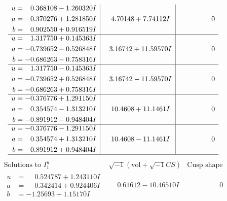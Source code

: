 \documentclass[1p]{elsarticle_modified}
\theoremstyle{definition}
\newcommand{\I}{\sqrt{-1}}
\begin{document}
$$\begin{array}{c|c|c}
\begin{aligned}
u &= \phantom{-}0.368108 - 1.260320 I \\
a &= -0.370276 + 1.281850 I \\
b &= \phantom{-}0.902550 + 0.916519 I\end{aligned}
 & \phantom{-}4.70148 + 7.74112 I & \phantom{-0.000000 } 0 \\ \hline\begin{aligned}
u &= \phantom{-}1.317750 + 0.145363 I \\
a &= -0.739652 - 0.526848 I \\
b &= -0.686263 - 0.758316 I\end{aligned}
 & \phantom{-}3.16742 + 11.59570 I & \phantom{-0.000000 } 0 \\ \hline\begin{aligned}
u &= \phantom{-}1.317750 - 0.145363 I \\
a &= -0.739652 + 0.526848 I \\
b &= -0.686263 + 0.758316 I\end{aligned}
 & \phantom{-}3.16742 - 11.59570 I & \phantom{-0.000000 } 0 \\ \hline\begin{aligned}
u &= -0.376776 + 1.291150 I \\
a &= \phantom{-}0.354574 - 1.313210 I \\
b &= -0.891912 - 0.948404 I\end{aligned}
 & \phantom{-}10.4608 + 11.1461 I & \phantom{-0.000000 } 0 \\ \hline\begin{aligned}
u &= -0.376776 - 1.291150 I \\
a &= \phantom{-}0.354574 + 1.313210 I \\
b &= -0.891912 + 0.948404 I\end{aligned}
 & \phantom{-}10.4608 - 11.1461 I & \phantom{-0.000000 } 0\\
 \hline 
 \end{array}$$\newpage$$\begin{array}{c|c|c}  
\text{Solutions to }I^u_{1}& \I (\text{vol} + \sqrt{-1}CS) & \text{Cusp shape}\\
 \hline 
\begin{aligned}
u &= \phantom{-}0.524787 + 1.243110 I \\
a &= \phantom{-}0.342414 + 0.924406 I \\
b &= -1.25693 + 1.15170 I\end{aligned}
 & \phantom{-}0.61612 - 10.46510 I & \phantom{-0.000000 } 0 \\ \hline\begin{aligned}

\end{aligned}
\end{array}$$
\end{document}
